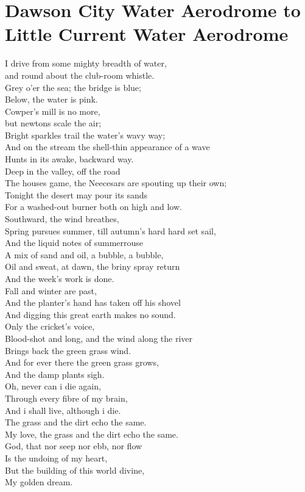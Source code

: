 \documentclass[smalldemyvopaper,11pt,twoside,onecolumn,openright,extrafontsizes]{memoir}
\begin{document}
\chapter{Dawson City Water Aerodrome to Little Current Water Aerodrome}
I drive from some mighty breadth of water,
\\and round about the club-room whistle.
\\Grey o'er the sea; the bridge is blue;
\\Below, the water is pink.
\\Cowper's mill is no more,
\\but newtons scale the air;
\\Bright sparkles trail the water's wavy way;
\\And on the stream the shell-thin appearance of a wave
\\Hunts in its awake, backward way.
\\Deep in the valley, off the road
\\The houses game, the Neecesars are spouting up their own;
\\Tonight the desert may pour its sands
\\For a washed-out burner both on high and low.
\\Southward, the wind breathes,
\\Spring pursues summer, till autumn's hard hard set sail,
\\And the liquid notes of summerrouse
\\A mix of sand and oil, a bubble, a bubble,
\\Oil and sweat, at dawn, the briny spray return
\\And the week's work is done.
\\Fall and winter are past,
\\And the planter's hand has taken off his shovel
\\And digging this great earth makes no sound.
\\Only the cricket's voice,
\\Blood-shot and long, and the wind along the river
\\Brings back the green grass wind.
\\And for ever there the green grass grows,
\\And the damp plants sigh.
\\Oh, never can i die again,
\\Through every fibre of my brain,
\\And i shall live, although i die.
\\The grass and the dirt echo the same.
\\My love, the grass and the dirt echo the same.
\\God, that nor seep nor ebb, nor flow
\\Is the undoing of my heart,
\\But the building of this world divine,
\\My golden dream.
\end{document}
